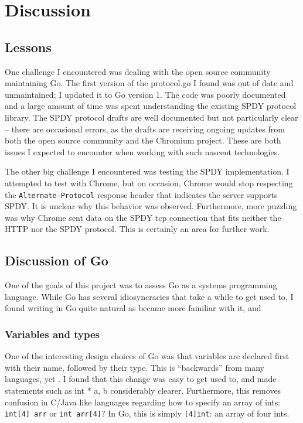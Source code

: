 \documentclass{article}
\begin{document}
\section{Discussion}
\subsection{Lessons}

One challenge I encountered was dealing with the open source community maintaining Go. The first version of the protocol.go I found was out of date and unmaintained; I updated it to Go version 1. The code was poorly documented and a large amount of time was spent understanding the existing SPDY protocol library.  The SPDY protocol drafts are well documented but not particularly clear -- there are occasional errors, as the drafts are receiving ongoing updates from both the open source community and the Chromium project. These are both issues I expected to encounter when working with such nascent technologies.

The other big challenge I encountered was testing the SPDY implementation. I attempted to test with Chrome, but on occasion, Chrome would stop respecting the \verb|Alternate-Protocol| response header that indicates the server supports SPDY. It is unclear why this behavior was observed. Furthermore, more puzzling was why Chrome sent data on the SPDY tcp connection that fits neither the HTTP nor the SPDY protocol. This is certainly an area for further work.

\subsection{Discussion of Go}
One of the goals of this project was to assess Go as a systems programming language. While Go has several idiosyncracies that take a while to get used to, I found writing in Go quite natural as became more familiar with it, and 
\subsubsection{Variables and types}
One of the interesting design choices of Go was that variables are declared first with their name, followed by their type. This is “backwards” from many languages, yet . I found that this change was easy to get used to, and made statements such as int * a, b considerably clearer. Furthermore, this removes confusion in C/Java like languages regarding how to specify an array of ints: \verb|int[4] arr| or \verb|int arr[4]|? In Go, this is simply \verb|[4]int|:  an array of four ints.
\end{document}
